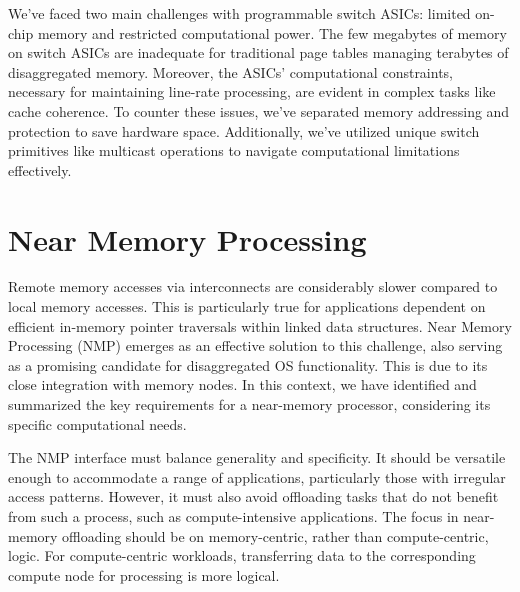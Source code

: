We've faced two main challenges with programmable switch ASICs: limited on-chip memory and restricted computational power. The few megabytes of memory on switch ASICs are inadequate for traditional page tables managing terabytes of disaggregated memory. Moreover, the ASICs' computational constraints, necessary for maintaining line-rate processing, are evident in complex tasks like cache coherence. To counter these issues, we've separated memory addressing and protection to save hardware space. Additionally, we've utilized unique switch primitives like multicast operations to navigate computational limitations effectively.





\section{Near Memory Processing}
\begin{comment}
    

\begin{figure*}[ht!]
    \centering
    \texttt{[image: chase.pdf]}\vspace{-1.0em}
    \caption{\textbf{CHASE Overview.}} \vspace{-1.5em}
    \label{fig:pulse}
  \end{figure*}
\end{comment}
Remote memory accesses via interconnects are considerably slower compared to local memory accesses. This is particularly true for applications dependent on efficient in-memory pointer traversals within linked data structures. Near Memory Processing (NMP) emerges as an effective solution to this challenge, also serving as a promising candidate for disaggregated OS functionality. This is due to its close integration with memory nodes. In this context, we have identified and summarized the key requirements for a near-memory processor, considering its specific computational needs.

 The NMP interface must balance generality and specificity. It should be versatile enough to accommodate a range of applications, particularly those with irregular access patterns. However, it must also avoid offloading tasks that do not benefit from such a process, such as compute-intensive applications. The focus in near-memory offloading should be on memory-centric, rather than compute-centric, logic. For compute-centric workloads, transferring data to the corresponding compute node for processing is more logical.

